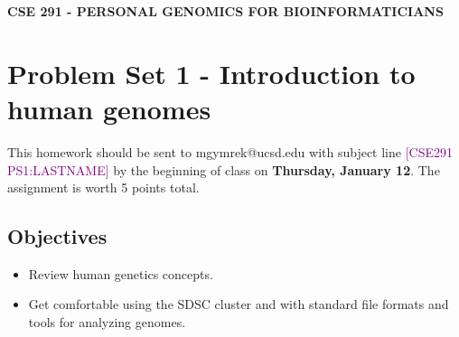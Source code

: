 \documentclass[12pt]{article}
\begin{document}
\textbf{CSE 291 - PERSONAL GENOMICS FOR BIOINFORMATICIANS}

\section*{Problem Set 1 - Introduction to human genomes}

This homework should be sent to mgymrek@ucsd.edu with subject line \textcolor{purple}{[CSE291 PS1:LASTNAME]} by the beginning of class on \textbf{Thursday, January 12}. The assignment is worth 5 points total.

\subsection*{Objectives}
\begin{itemize}
\setlength\itemsep{0.0em}
\item Review human genetics concepts.
\item Get comfortable using the SDSC cluster and with standard file formats and tools for analyzing genomes.
\end{itemize}
\end{document}
